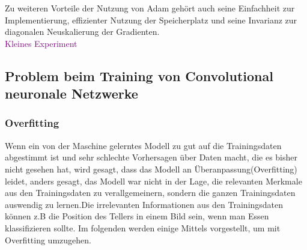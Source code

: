 \documentclass[12pt,a4paper]{scrartcl}
\numberwithin{equation}{section}
\begin{document}
Zu weiteren Vorteile der Nutzung von Adam gehört auch seine Einfachheit zur Implementierung, effizienter Nutzung der Speicherplatz und seine Invarianz zur diagonalen Neuskalierung der Gradienten.
\\ \textcolor{purple}{Kleines Experiment}


\subsection{Problem beim Training von  Convolutional   neuronale Netzwerke}
\subsubsection{Overfitting }\label{Overfitting}
Wenn ein von der Maschine gelerntes Modell zu gut auf die Trainingsdaten abgestimmt ist und sehr schlechte Vorhersagen über Daten macht, die es bisher nicht gesehen hat, wird gesagt, dass das Modell an Überanpassung(Overfitting) leidet, anders gesagt, das Modell war nicht in der Lage, die relevanten Merkmale aus den Trainingsdaten zu verallgemeinern, sondern die ganzen Trainingsdaten auswendig zu lernen.Die irrelevanten Informationen aus den Trainingsdaten können z.B die Position des Tellers in einem Bild sein, wenn man Essen klassifizieren sollte. Im folgenden werden einige Mittels vorgestellt, um mit Overfitting umzugehen.\\
\end{document}
